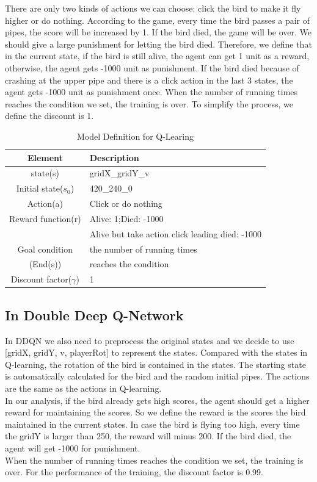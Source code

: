 \documentclass[conference,compsoc]{IEEEtran}
\begin{document}
\indent 
There are only two kinds of actions we can choose: click the bird to make it fly higher or do nothing. According to the game, every time the bird passes a pair of pipes, the score will be increased by 1. If the bird died, the game will be over. We should give a large punishment for letting the bird died. Therefore, we define that in the current state, if the bird is still alive, the agent can get 1 unit as a reward, otherwise, the agent gets -1000 unit as punishment. If the bird died because of crashing at the upper pipe and there is a click action in the last 3 states, the agent gets -1000 unit as punishment once. When the number of running times reaches the condition we set, the training is over. To simplify the process, we define the discount is 1.

\begin{table}[!t]
\renewcommand{\arraystretch}{1.3}
\caption{Model Definition for Q-Learing}
\label{table_2}
\centering
\begin{tabular}{|c|p{130pt}|}
\hline
Element & Description\\
\hline
state(s) & gridX\_gridY\_v
\\
\hline
Initial state(${s_0}$) &420\_240\_0
\\
\hline
Action(a) & Click or do nothing\\
\hline
Reward function(r) & Alive: 1;Died: -1000\\
 & Alive but take action click leading died: -1000\\
\hline
Goal condition & the number of running times\\
(End(s)) &reaches the condition\\
\hline
Discount factor(${\gamma}$) &1 \\
\hline
\end{tabular}
\end{table}

\subsection{In Double Deep Q-Network}
In DDQN we also need to preprocess the original states and we decide to use [gridX, gridY, v, playerRot] to represent the states. Compared with the states in Q-learning, the rotation of the bird is contained in the states. The starting state is automatically calculated for the bird and the random initial pipes. The actions are the same as the actions in Q-learning. 
\\
\indent 
In our analysis, if the bird already gets high scores, the agent should get a higher reward for maintaining the scores. So we define the reward is the scores the bird maintained in the current states. In case the bird is flying too high, every time the gridY is larger than 250, the reward will minus 200. If the bird died, the agent will get -1000 for punishment.
\\
\indent 
When the number of running times reaches the condition we set, the training is over. For the performance of the training, the discount factor is 0.99.
\end{document}
